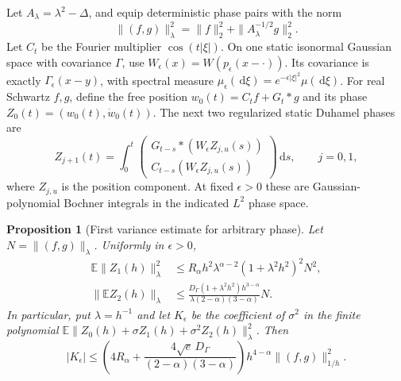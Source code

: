 \documentclass[12pt]{article}
\numberwithin{equation}{section}
\newtheorem{proposition}[theorem]{Proposition}
\theoremstyle{definition}
\newcommand{\E}{\mathbb{E}}
\newcommand{\ud}{\,\mathrm{d}}
\begin{document}
Let $A_\lambda=\lambda^2-\Delta$, and equip deterministic phase pairs
with the norm
\begin{equation}\label{E:phase-norm}
  \|(f,g)\|_\lambda^2
  =\|f\|_2^2+\|A_\lambda^{-1/2}g\|_2^2.
\end{equation}
Let $C_t$ be the Fourier multiplier $\cos(t|\xi|)$.
On one static isonormal Gaussian space with covariance $\Gamma$, use
$W_\epsilon(x)=W(p_\epsilon(x-\cdot))$. Its covariance is exactly
$\Gamma_\epsilon(x-y)$, with spectral measure
$\mu_\epsilon(\ud\xi)=e^{-\epsilon|\xi|^2}\mu(\ud\xi)$.
For real Schwartz $f,g$, define the free position
$w_0(t)=C_tf+G_t*g$ and its phase $Z_0(t)=(w_0(t),\dot w_0(t))$.
The next two regularized static Duhamel phases are
\begin{equation}\label{E:phase-duhamel}
  Z_{j+1}(t)
  =\int_0^t
  \begin{pmatrix}
    G_{t-s}*(W_\epsilon Z_{j,u}(s))\\
    C_{t-s}(W_\epsilon Z_{j,u}(s))
  \end{pmatrix}\ud s,\qquad j=0,1,
\end{equation}
where $Z_{j,u}$ is the position component. At fixed $\epsilon>0$
these are Gaussian-polynomial Bochner integrals in the indicated
$L^2$ phase space.

\begin{proposition}[First variance estimate for arbitrary phase]
  \label{P:static-phase-variance}
  Let $N=\|(f,g)\|_\lambda$. Uniformly in $\epsilon>0$,
  \begin{align}
    \E\|Z_1(h)\|_\lambda^2
    &\le R_\alpha h^2\lambda^{\alpha-2}
    (1+\lambda^2h^2)^2N^2,\label{E:phase-born}\\
    \|\E Z_2(h)\|_\lambda
    &\le\frac{D_\Gamma(1+\lambda^2h^2)h^{3-\alpha}}
    {\lambda(2-\alpha)(3-\alpha)}N.
    \label{E:phase-mean}
  \end{align}
  In particular, put $\lambda=h^{-1}$ and let $K_\epsilon$ be the
  coefficient of $\sigma^2$ in the finite polynomial
  $\E\|Z_0(h)+\sigma Z_1(h)+\sigma^2Z_2(h)\|_\lambda^2$.
  Then
  \begin{equation}\label{E:phase-variance}
    |K_\epsilon|
    \le\left(4R_\alpha+
    \frac{4\sqrt e\,D_\Gamma}{(2-\alpha)(3-\alpha)}\right)
    h^{4-\alpha}\|(f,g)\|_{1/h}^2.
  \end{equation}
\end{proposition}
\end{document}
